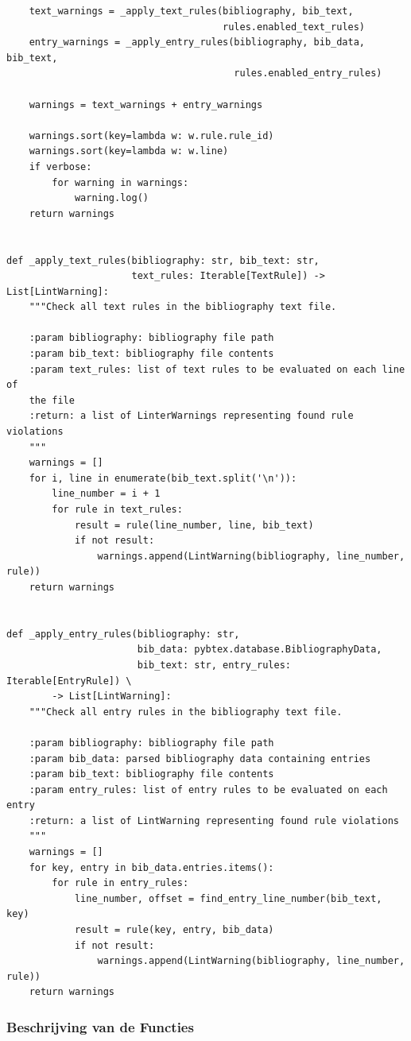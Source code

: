 \begin{verbatim}
    text_warnings = _apply_text_rules(bibliography, bib_text,
                                      rules.enabled_text_rules)
    entry_warnings = _apply_entry_rules(bibliography, bib_data, bib_text,
                                        rules.enabled_entry_rules)

    warnings = text_warnings + entry_warnings

    warnings.sort(key=lambda w: w.rule.rule_id)
    warnings.sort(key=lambda w: w.line)
    if verbose:
        for warning in warnings:
            warning.log()
    return warnings


def _apply_text_rules(bibliography: str, bib_text: str,
                      text_rules: Iterable[TextRule]) -> List[LintWarning]:
    """Check all text rules in the bibliography text file.

    :param bibliography: bibliography file path
    :param bib_text: bibliography file contents
    :param text_rules: list of text rules to be evaluated on each line of
    the file
    :return: a list of LinterWarnings representing found rule violations
    """
    warnings = []
    for i, line in enumerate(bib_text.split('\n')):
        line_number = i + 1
        for rule in text_rules:
            result = rule(line_number, line, bib_text)
            if not result:
                warnings.append(LintWarning(bibliography, line_number, rule))
    return warnings


def _apply_entry_rules(bibliography: str,
                       bib_data: pybtex.database.BibliographyData,
                       bib_text: str, entry_rules: Iterable[EntryRule]) \
        -> List[LintWarning]:
    """Check all entry rules in the bibliography text file.

    :param bibliography: bibliography file path
    :param bib_data: parsed bibliography data containing entries
    :param bib_text: bibliography file contents
    :param entry_rules: list of entry rules to be evaluated on each entry
    :return: a list of LintWarning representing found rule violations
    """
    warnings = []
    for key, entry in bib_data.entries.items():
        for rule in entry_rules:
            line_number, offset = find_entry_line_number(bib_text, key)
            result = rule(key, entry, bib_data)
            if not result:
                warnings.append(LintWarning(bibliography, line_number, rule))
    return warnings
\end{verbatim}

\subsubsection{Beschrijving van de Functies}

